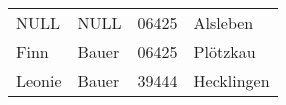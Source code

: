 \begin{center}
    \begin{small}
        \tablehead{}
        \tabletail {
        }
        \begin{mssql}
            \begin{supertabular}{llll}
                NULL & NULL & 06425 & Alsleben \\
                Finn & Bauer & 06425 & Plötzkau \\
                Leonie & Bauer & 39444 & Hecklingen \\
            \end{supertabular}
        \end{mssql}
    \end{small}
\end{center}
